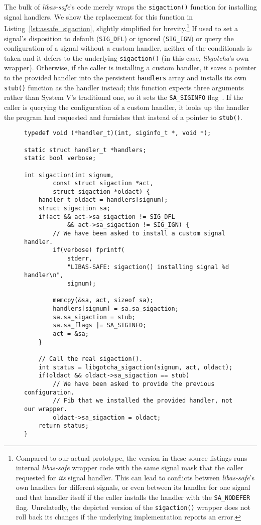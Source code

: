 The bulk of \textit{libas-safe}'s code merely wraps the \texttt{sigaction()} function
for installing signal handlers.  We show the replacement for this function in
Listing~\ref{lst:assafe_sigaction}, slightly simplified for
brevity.\footnote{Compared to our actual prototype, the version in these source
listings runs internal \textit{libas-safe} wrapper code with the same signal mask that
the caller requested for \textit{its} signal handler.  This can lead to conflicts
between \textit{libas-safe}'s own handlers for different signals, or even between its
handler for one signal and that handler itself if the caller installs the handler
with the \texttt{SA\_NODEFER} flag.  Unrelatedly, the depicted version of the
\texttt{sigaction()} wrapper does not roll back its changes if the underlying
implementation reports an error.}  If used to set a signal's disposition to default
(\texttt{SIG\_DFL}) or ignored (\texttt{SIG\_IGN}) or query the configuration of a
signal without a custom handler, neither of the conditionals is taken and it defers
to the underlying \texttt{sigaction()} (in this case, \textit{libgotcha}'s own
wrapper).  Otherwise, if the caller is installing a custom handler, it saves a
pointer to the provided handler into the persistent \texttt{handlers} array and
installs its own \texttt{stub()} function as the handler instead; this function
expects three arguments rather than System V's traditional one, so it sets the
\texttt{SA\_SIGINFO} flag~\cite{sigaction-manpage}.  If the caller is querying the
configuration of a custom handler, it looks up the handler the program had requested
and furnishes that instead of a pointer to \texttt{stub()}.

\begin{figure}[p]
\begin{leftfullpage}
\begin{lstlisting}[label=lst:assafe_sigaction,caption=\textit{libas-safe}'s \texttt{sigaction()} replacement]
typedef void (*handler_t)(int, siginfo_t *, void *);

static struct handler_t *handlers;
static bool verbose;

int sigaction(int signum,
		const struct sigaction *act,
		struct sigaction *oldact) {
	handler_t oldact = handlers[signum];
	struct sigaction sa;
	if(act && act->sa_sigaction != SIG_DFL
			&& act->sa_sigaction != SIG_IGN) {
		// We have been asked to install a custom signal handler.
		if(verbose) fprintf(
			stderr,
			"LIBAS-SAFE: sigaction() installing signal %d handler\n",
			signum);

		memcpy(&sa, act, sizeof sa);
		handlers[signum] = sa.sa_sigaction;
		sa.sa_sigaction = stub;
		sa.sa_flags |= SA_SIGINFO;
		act = &sa;
	}

	// Call the real sigaction().
	int status = libgotcha_sigaction(signum, act, oldact);
	if(oldact && oldact->sa_sigaction == stub)
		// We have been asked to provide the previous configuration.
		// Fib that we installed the provided handler, not our wrapper.
		oldact->sa_sigaction = oldact;
	return status;
}
\end{lstlisting}
\end{leftfullpage}
\end{figure}

